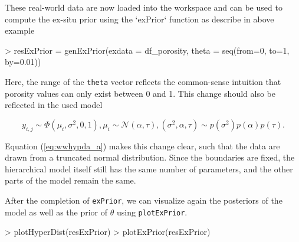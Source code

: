 These real-world data are now loaded into the workspace and can be used to compute the ex-situ prior using the `exPrior` function as describe in above example

\begin{example}
> resExPrior = genExPrior(exdata = df_porosity, theta = seq(from=0, to=1, by=0.01))
\end{example}

Here, the range of the \texttt{theta} vector reflects the common-sense intuition that porosity values can only exist between 0 and 1. 
This change should also be reflected in the used model

\begin{subequations}
\label{eq:wwhypda}
    \begin{equation}
    \label{eq:wwhypda_a}
        y_{i,j} \sim \Phi(\mu_i, \sigma^2, 0, 1),
    \end{equation}
    \begin{equation}
        \mu_i \sim \mathcal{N}(\alpha,\tau),
    \end{equation}
    \begin{equation}
        (\sigma^2, \alpha, \tau) \sim p(\sigma^2)p(\alpha)p(\tau).
    \end{equation}
\end{subequations}

Equation (\ref{eq:wwhypda_a}) makes this change clear, such that the data are drawn from a truncated normal distribution. 
Since the boundaries are fixed, the hierarchical model itself still has the same number of parameters, and the other parts of the model remain the same.

After the completion of \texttt{exPrior}, we can visualize again the posteriors of the model as well as the prior of $\theta$ using \texttt{plotExPrior}. 

\begin{example}
> plotHyperDist(resExPrior)
> plotExPrior(resExPrior)
\end{example}

